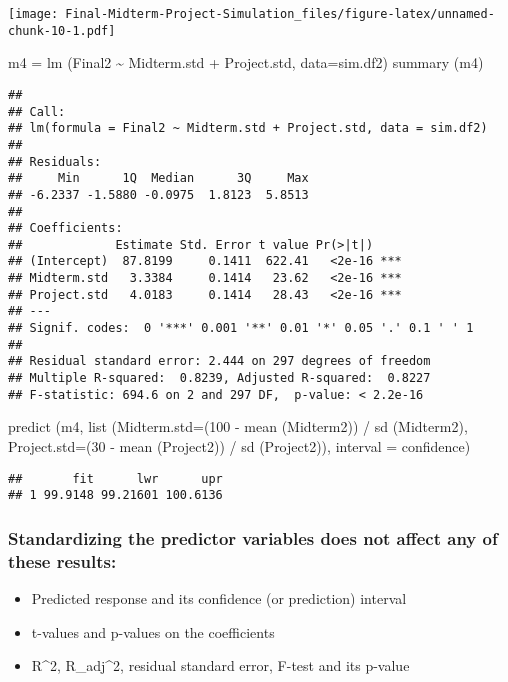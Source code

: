 \documentclass[
]{article}
\newenvironment{Shaded}{\begin{snugshade}}{\end{snugshade}}
\newcommand{\AttributeTok}[1]{\textcolor[rgb]{0.77,0.63,0.00}{#1}}
\newcommand{\DecValTok}[1]{\textcolor[rgb]{0.00,0.00,0.81}{#1}}
\newcommand{\FunctionTok}[1]{\textcolor[rgb]{0.00,0.00,0.00}{#1}}
\newcommand{\NormalTok}[1]{#1}
\newcommand{\OtherTok}[1]{\textcolor[rgb]{0.56,0.35,0.01}{#1}}
\newcommand{\SpecialCharTok}[1]{\textcolor[rgb]{0.00,0.00,0.00}{#1}}
\newcommand{\StringTok}[1]{\textcolor[rgb]{0.31,0.60,0.02}{#1}}
\providecommand{\tightlist}{%
  \setlength{\itemsep}{0pt}\setlength{\parskip}{0pt}}
\begin{document}
\texttt{[image: Final-Midterm-Project-Simulation\_files/figure-latex/unnamed-chunk-10-1.pdf]}

\begin{Shaded}
\begin{Highlighting}[]
\NormalTok{m4 }\OtherTok{=} \FunctionTok{lm}\NormalTok{ (Final2 }\SpecialCharTok{\textasciitilde{}}\NormalTok{ Midterm.std }\SpecialCharTok{+}\NormalTok{ Project.std, }\AttributeTok{data=}\NormalTok{sim.df2)}
\FunctionTok{summary}\NormalTok{ (m4)}
\end{Highlighting}
\end{Shaded}

\begin{verbatim}
## 
## Call:
## lm(formula = Final2 ~ Midterm.std + Project.std, data = sim.df2)
## 
## Residuals:
##     Min      1Q  Median      3Q     Max 
## -6.2337 -1.5880 -0.0975  1.8123  5.8513 
## 
## Coefficients:
##             Estimate Std. Error t value Pr(>|t|)    
## (Intercept)  87.8199     0.1411  622.41   <2e-16 ***
## Midterm.std   3.3384     0.1414   23.62   <2e-16 ***
## Project.std   4.0183     0.1414   28.43   <2e-16 ***
## ---
## Signif. codes:  0 '***' 0.001 '**' 0.01 '*' 0.05 '.' 0.1 ' ' 1
## 
## Residual standard error: 2.444 on 297 degrees of freedom
## Multiple R-squared:  0.8239, Adjusted R-squared:  0.8227 
## F-statistic: 694.6 on 2 and 297 DF,  p-value: < 2.2e-16
\end{verbatim}

\begin{Shaded}
\begin{Highlighting}[]
\FunctionTok{predict}\NormalTok{ (m4, }\FunctionTok{list}\NormalTok{ (}\AttributeTok{Midterm.std=}\NormalTok{(}\DecValTok{100} \SpecialCharTok{{-}} \FunctionTok{mean}\NormalTok{ (Midterm2)) }\SpecialCharTok{/} \FunctionTok{sd}\NormalTok{ (Midterm2), }
                   \AttributeTok{Project.std=}\NormalTok{(}\DecValTok{30} \SpecialCharTok{{-}} \FunctionTok{mean}\NormalTok{ (Project2)) }\SpecialCharTok{/} \FunctionTok{sd}\NormalTok{ (Project2)), }\AttributeTok{interval =} \StringTok{\textquotesingle{}confidence\textquotesingle{}}\NormalTok{)}
\end{Highlighting}
\end{Shaded}

\begin{verbatim}
##       fit      lwr      upr
## 1 99.9148 99.21601 100.6136
\end{verbatim}

\hypertarget{standardizing-the-predictor-variables-does-not-affect-any-of-these-results}{%
\subsubsection{Standardizing the predictor variables does not affect any
of these
results:}\label{standardizing-the-predictor-variables-does-not-affect-any-of-these-results}}

\begin{itemize}
\tightlist
\item
  Predicted response and its confidence (or prediction) interval
\item
  t-values and p-values on the coefficients
\item
  R\^{}2, R\_adj\^{}2, residual standard error, F-test and its p-value
\end{itemize}
\end{document}
